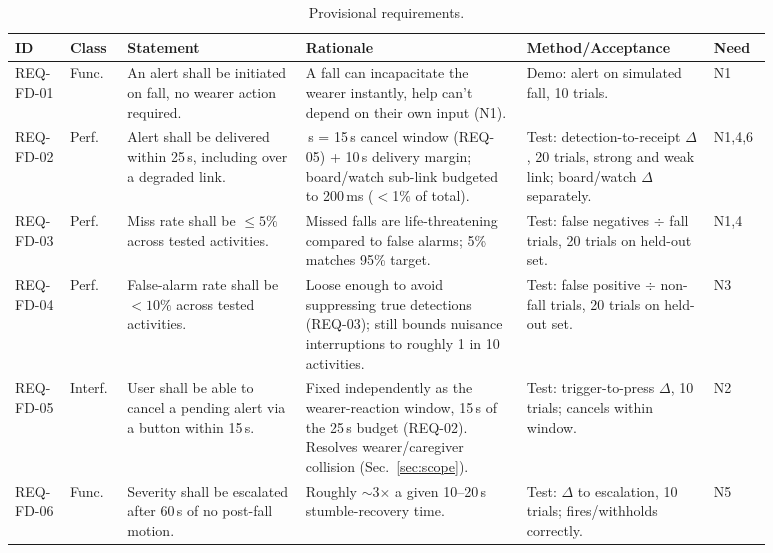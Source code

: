 
\begin{table}[!ht]
\centering
\caption{Provisional requirements.}
\label{tab:requirements}
\scriptsize
\renewcommand{\arraystretch}{1.25}
\setlength{\tabcolsep}{3pt}
\begin{tabularx}{\linewidth}{@{}
  >{\raggedright\arraybackslash}p{0.06\linewidth}
  >{\raggedright\arraybackslash}p{0.065\linewidth}
  >{\raggedright\arraybackslash}p{0.21\linewidth}
  >{\raggedright\arraybackslash}p{0.265\linewidth}
  >{\raggedright\arraybackslash}p{0.22\linewidth}
  >{\raggedright\arraybackslash}p{0.055\linewidth}@{}}
\toprule
ID & Class & Statement & Rationale & Method/Acceptance & Need \\
\midrule
REQ-FD-01 & Func. & An alert shall be initiated on fall, no wearer action required. & A fall can incapacitate the wearer instantly, help can't depend on their own input (N1). & Demo: alert on simulated fall, 10 trials. & N1 \\
REQ-FD-02 & Perf. & Alert shall be delivered within 25\,s, including over a degraded link. & 25\,s = 15\,s cancel window (REQ-05) + 10\,s delivery margin; board/watch sub-link budgeted to 200\,ms ($<$1\% of total). & Test: detection-to-receipt $\Delta$, 20 trials, strong and weak link; board/watch $\Delta$ separately. & N1,4,6 \\
REQ-FD-03 & Perf. & Miss rate shall be $\leq 5\%$ across tested activities. & Missed falls are life-threatening compared to false alarms; 5\% matches 95\% target. & Test: false negatives $\div$ fall trials, 20 trials on held-out set. & N1,4 \\
REQ-FD-04 & Perf. & False-alarm rate shall be $< 10\%$ across tested activities. & Loose enough to avoid suppressing true detections (REQ-03); still bounds nuisance interruptions to roughly 1 in 10 activities. & Test: false positive $\div$ non-fall trials, 20 trials on held-out set. & N3 \\
REQ-FD-05 & Interf. & User shall be able to cancel a pending alert via a button within 15\,s. & Fixed independently as the wearer-reaction window, 15\,s of the 25\,s budget (REQ-02). Resolves wearer/caregiver collision (Sec.~\ref{sec:scope}). & Test: trigger-to-press $\Delta$, 10 trials; cancels within window. & N2 \\
REQ-FD-06 & Func. & Severity shall be escalated after 60\,s of no post-fall motion. & Roughly $\sim$3$\times$ a given 10--20\,s stumble-recovery time. & Test: $\Delta$ to escalation, 10 trials; fires/withholds correctly. & N5 \\

\end{tabularx}
\end{table}

